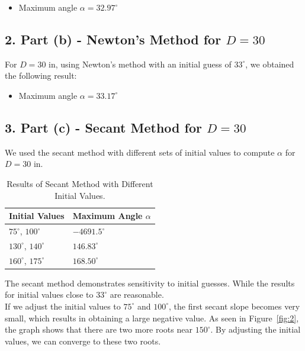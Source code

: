 \documentclass[a4paper]{article}
\begin{document}
\begin{itemize}
    \item Maximum angle \( \alpha = 32.97^\circ \)
\end{itemize}

\subsection*{2. Part (b) - Newton’s Method for \( D = 30 \)}

For \( D = 30 \) in, using Newton's method with an initial guess of \( 33^\circ \), we obtained the following result:

\begin{itemize}
    \item Maximum angle \( \alpha = 33.17^\circ \)
\end{itemize}

\subsection*{3. Part (c) - Secant Method for \( D = 30 \)}

We used the secant method with different sets of initial values to compute \( \alpha \) for \( D = 30 \) in.

\begin{table}[h!]
\centering
\begin{tabular}{ll}
\toprule
\textbf{Initial Values } & \textbf{Maximum Angle \( \alpha \) } \\
\midrule
\( 75^\circ \), \( 100^\circ \) & \( -4691.5^\circ \)  \\
\( 130^\circ \), \( 140^\circ \) & \( 146.83^\circ \) \\
\( 160^\circ \), \( 175^\circ \) & \( 168.50^\circ \) \\
\bottomrule
\end{tabular}
\caption{Results of Secant Method with Different Initial Values.}
\end{table}

The secant method demonstrates sensitivity to initial guesses. While the results for initial values close to \( 33^\circ \) are reasonable.\\
If we adjust the initial values to \( 75^\circ \) and \( 100^\circ \), the first secant slope becomes very small, which results in obtaining a large negative value. As seen in Figure~\ref{fig:2}, the graph shows that there are two more roots near \( 150^\circ \). By adjusting the initial values, we can converge to these two roots.\\
\end{document}
